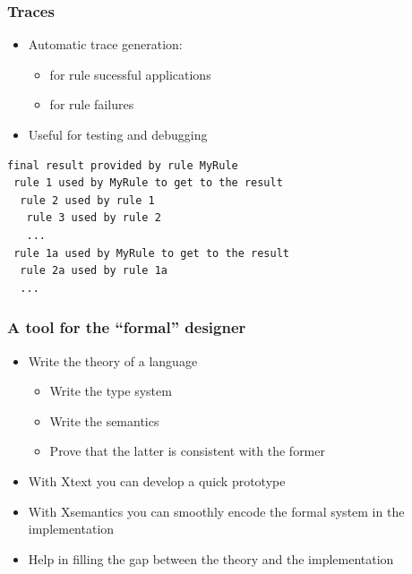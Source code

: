 \begin{frame}[fragile]
\frametitle{Traces}

\begin{itemize}
  \item Automatic trace generation:
  \begin{itemize}
    \item for rule sucessful applications
    \item for rule failures
  \end{itemize}
  \item Useful for testing and debugging
\end{itemize}

\medskip

\begin{footnotesize}
\begin{verbatim}
final result provided by rule MyRule
 rule 1 used by MyRule to get to the result
  rule 2 used by rule 1
   rule 3 used by rule 2
   ...
 rule 1a used by MyRule to get to the result
  rule 2a used by rule 1a
  ...
\end{verbatim}
\end{footnotesize}

\end{frame}

\begin{frame}
\frametitle{A tool for the ``formal'' designer}

\begin{itemize}
  \item Write the theory of a language
  \begin{itemize}
    \item Write the type system
    \item Write the semantics
    \item Prove that the latter is consistent with the former
  \end{itemize}   
  \item With Xtext you can develop a quick prototype
  \item With Xsemantics you can smoothly encode the formal system
  in the implementation
  \item Help in filling the gap between the theory and the implementation
\end{itemize}

\end{frame}